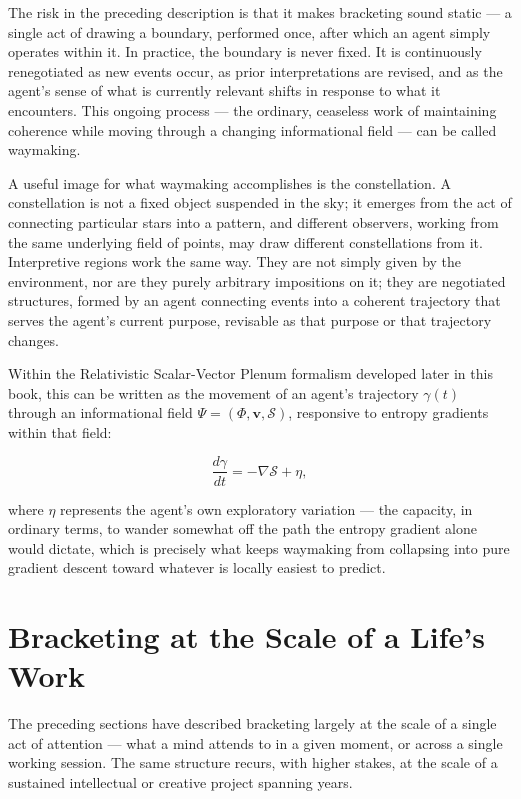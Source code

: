 \documentclass[12pt,a4paper]{book}
\begin{document}
The risk in the preceding description is that it makes bracketing sound static — a single act of drawing a boundary, performed once, after which an agent simply operates within it. In practice, the boundary is never fixed. It is continuously renegotiated as new events occur, as prior interpretations are revised, and as the agent's sense of what is currently relevant shifts in response to what it encounters. This ongoing process — the ordinary, ceaseless work of maintaining coherence while moving through a changing informational field — can be called waymaking.

A useful image for what waymaking accomplishes is the constellation. A constellation is not a fixed object suspended in the sky; it emerges from the act of connecting particular stars into a pattern, and different observers, working from the same underlying field of points, may draw different constellations from it. Interpretive regions work the same way. They are not simply given by the environment, nor are they purely arbitrary impositions on it; they are negotiated structures, formed by an agent connecting events into a coherent trajectory that serves the agent's current purpose, revisable as that purpose or that trajectory changes.

Within the Relativistic Scalar-Vector Plenum formalism developed later in this book, this can be written as the movement of an agent's trajectory $\gamma(t)$ through an informational field $\Psi = (\Phi, \mathbf{v}, \mathcal{S})$, responsive to entropy gradients within that field:

\[\frac{d\gamma}{dt} = -\nabla \mathcal{S} + \eta,\]

where $\eta$ represents the agent's own exploratory variation — the capacity, in ordinary terms, to wander somewhat off the path the entropy gradient alone would dictate, which is precisely what keeps waymaking from collapsing into pure gradient descent toward whatever is locally easiest to predict.

\section{Bracketing at the Scale of a Life's Work}

The preceding sections have described bracketing largely at the scale of a single act of attention — what a mind attends to in a given moment, or across a single working session. The same structure recurs, with higher stakes, at the scale of a sustained intellectual or creative project spanning years.
\end{document}
